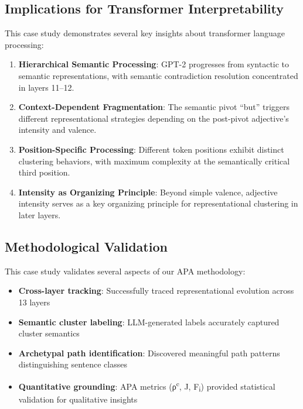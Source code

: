 \subsection{Implications for Transformer Interpretability}

This case study demonstrates several key insights about transformer language processing:

\begin{enumerate}
    \item \textbf{Hierarchical Semantic Processing}: GPT-2 progresses from syntactic to semantic representations, with semantic contradiction resolution concentrated in layers 11--12.
    
    \item \textbf{Context-Dependent Fragmentation}: The semantic pivot ``but'' triggers different representational strategies depending on the post-pivot adjective's intensity and valence.
    
    \item \textbf{Position-Specific Processing}: Different token positions exhibit distinct clustering behaviors, with maximum complexity at the semantically critical third position.
    
    \item \textbf{Intensity as Organizing Principle}: Beyond simple valence, adjective intensity serves as a key organizing principle for representational clustering in later layers.
\end{enumerate}

\subsection{Methodological Validation}

This case study validates several aspects of our APA methodology:

\begin{itemize}
    \item \textbf{Cross-layer tracking}: Successfully traced representational evolution across 13 layers
    \item \textbf{Semantic cluster labeling}: LLM-generated labels accurately captured cluster semantics
    \item \textbf{Archetypal path identification}: Discovered meaningful path patterns distinguishing sentence classes
    \item \textbf{Quantitative grounding}: APA metrics (ρ\textsuperscript{c}, J, F\textsubscript{i}) provided statistical validation for qualitative insights
\end{itemize}

